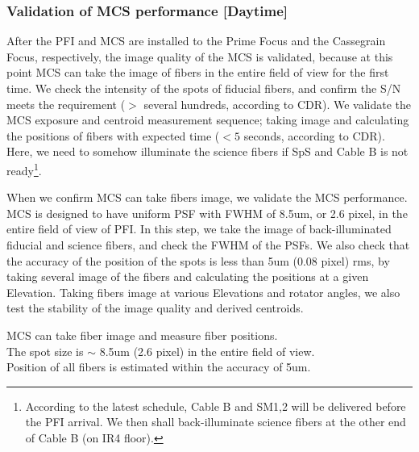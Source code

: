 \subsubsection{Validation of MCS performance [Daytime]}\label{secflow:MCSperf}


After the PFI and MCS are installed to the Prime Focus and the Cassegrain  Focus, respectively, the image quality of the MCS is validated, because at this point MCS can take the image of fibers in the entire field of view for the first time.
We check the intensity of the spots of fiducial fibers, and confirm the S/N meets the requirement ($>$ several hundreds, according to CDR).
We validate the MCS exposure and centroid measurement sequence; taking image and calculating the positions of fibers with expected time ($<5$ seconds, according to CDR).
Here, we need to somehow illuminate the science fibers if SpS and Cable B is not ready\footnote{According to the latest schedule, Cable B and SM1,2 will be delivered before the PFI arrival. We then shall back-illuminate science fibers at the other end of Cable B (on IR4 floor).}.

When we confirm MCS can take fibers image, we validate the MCS performance.
MCS is designed to have uniform PSF with FWHM of 8.5um, or 2.6 pixel, in the entire field of view of PFI.
In this step, we take the image of back-illuminated fiducial and science fibers, and check the FWHM of the PSFs.
We also check that the accuracy of the position of the spots is less than 5um (0.08 pixel) rms, by taking several image of the fibers and calculating the positions at a given Elevation.
Taking fibers image at various Elevations and rotator angles, we also test the stability of the image quality and derived centroids.

\begin{itembox}[l]{}
MCS can take fiber image and measure fiber positions. \\
The spot size is $\sim$ 8.5um (2.6 pixel) in the entire field of view. \\
Position of all fibers is estimated within the accuracy of 5um.

\end{itembox}